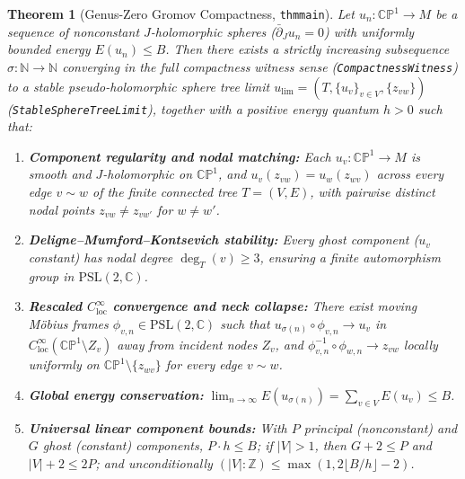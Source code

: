 \documentclass[10pt]{article}
\renewcommand{\_}{\origus\allowbreak}
\newtheorem{theorem}{Theorem}
\newcommand{\CP}{\mathbb{CP}^1}
\newcommand{\C}{\mathbb{C}}
\newcommand{\Z}{\mathbb{Z}}
\newcommand{\N}{\mathbb{N}}
\newcommand{\code}[1]{\texttt{#1}}
\begin{document}
\begin{theorem}[Genus-Zero Gromov Compactness, \code{thm\_main}]\label{thm:main}
Let $u_n : \CP \to M$ be a sequence of nonconstant $J$-holomorphic spheres ($\bar\partial_J u_n = 0$)
with uniformly bounded energy $E(u_n) \le B$. Then there exists a strictly increasing subsequence
$\sigma : \N \to \N$ converging in the full compactness witness sense (\code{CompactnessWitness}) to
a stable pseudo-holomorphic sphere tree limit $u_{\mathrm{lim}} = (T, \{u_v\}_{v\in V}, \{z_{vw}\})$
(\code{StableSphereTreeLimit}), together with a positive energy quantum $h > 0$ such that:
\begin{enumerate}[label=(\roman*)]
\item \textbf{Component regularity and nodal matching:} Each $u_v : \CP \to M$ is smooth and
  $J$-holomorphic on $\CP$, and $u_v(z_{vw}) = u_w(z_{wv})$ across every edge $v \sim w$ of the
  finite connected tree $T = (V,E)$, with pairwise distinct nodal points $z_{vw} \ne z_{vw'}$ for $w \ne w'$.
\item \textbf{Deligne--Mumford--Kontsevich stability:} Every ghost component ($u_v$ constant) has
  nodal degree $\deg_T(v) \ge 3$, ensuring a finite automorphism group in $\mathrm{PSL}(2,\C)$.
\item \textbf{Rescaled $C^\infty_{\mathrm{loc}}$ convergence and neck collapse:} There exist moving
  M\"obius frames $\phi_{v,n} \in \mathrm{PSL}(2,\C)$ such that
  $u_{\sigma(n)} \circ \phi_{v,n} \to u_v$ in $C^\infty_{\mathrm{loc}}(\CP \setminus Z_v)$ away from
  incident nodes $Z_v$, and $\phi_{v,n}^{-1} \circ \phi_{w,n} \to z_{vw}$ locally uniformly on
  $\CP \setminus \{z_{wv}\}$ for every edge $v \sim w$.
\item \textbf{Global energy conservation:}
  $\lim_{n\to\infty} E(u_{\sigma(n)}) = \sum_{v \in V} E(u_v) \le B$.
\item \textbf{Universal linear component bounds:} With $P$ principal (nonconstant) and $G$ ghost
  (constant) components, $P \cdot h \le B$; if $|V| > 1$, then $G + 2 \le P$ and $|V| + 2 \le 2P$;
  and unconditionally $(|V| : \Z) \le \max(1, 2\lfloor B/h \rfloor - 2)$.
\end{enumerate}
\end{theorem}
\end{document}
